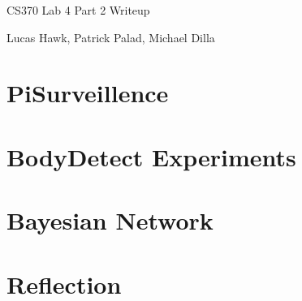 \documentclass{article}
\begin{document}
\begin{center}
\begin{large}
CS370 Lab 4 Part 2 Writeup\\
\end{large}
Lucas Hawk, Patrick Palad, Michael Dilla
\end{center}

\section{PiSurveillence}


\section{BodyDetect Experiments}


\section{Bayesian Network}


\section{Reflection}

\end{document}
